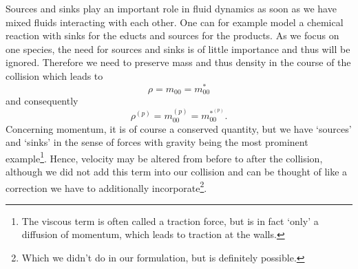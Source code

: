 Sources and sinks play an important role in fluid dynamics as soon as we have mixed fluids interacting with each other.
One can for example model a chemical reaction with sinks for the educts and sources for the products.
As we focus on one species, the need for sources and sinks is of little importance and thus will be ignored.
Therefore we need to preserve mass and thus density in the course of the collision which leads to
\begin{equation}
    \rho  = m_{00} = m_{00}^*
\end{equation}
and consequently
\begin{equation}
  \label{eq: absence of sources}
    \rho^{(p)} = m_{00}^{(p)} = m_{00}^{*^{(p)}}.
\end{equation}
Concerning momentum, it is of course a conserved quantity, but we have `sources' and `sinks' in the sense of forces with gravity being the most prominent example\footnote{The viscous term is often called a traction force, but is in fact `only' a diffusion of momentum, which leads to traction at the walls.}.
Hence, velocity may be altered from before to after the collision, although we did not add this term into our collision and can be thought of like a correction we have to additionally incorporate\footnote{Which we didn't do in our formulation, but is definitely possible.}.
